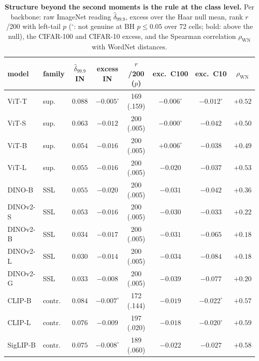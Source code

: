 \begin{table}[t]
\centering
\small
\setlength{\tabcolsep}{3.4pt}
\begin{tabular}{l l c c c c c c}
\toprule
model & family & $\hat\delta_{99.9}$ IN & excess IN & $r$/200 ($p$) & exc.\ C100 & exc.\ C10 & $\rho_{\text{WN}}$ \\
\midrule
ViT-T & sup. & $0.088$ & $-0.005^{\circ}$ & 169 (.159) & $-0.006^{\circ}$ & $-0.012^{\circ}$ & $+0.52$ \\
ViT-S & sup. & $0.063$ & $-0.012$ & 200 (.005) & $-0.000^{\circ}$ & $-0.042$ & $+0.50$ \\
ViT-B & sup. & $0.054$ & $-0.016$ & 200 (.005) & \textbf{$+0.006^{\circ}$} & $-0.038$ & $+0.49$ \\
ViT-L & sup. & $0.055$ & $-0.016$ & 200 (.005) & $-0.020$ & $-0.037$ & $+0.53$ \\
\midrule
DINO-B & SSL & $0.055$ & $-0.020$ & 200 (.005) & $-0.031$ & $-0.042$ & $+0.36$ \\
DINOv2-S & SSL & $0.053$ & $-0.016$ & 200 (.005) & $-0.030$ & $-0.033$ & $+0.22$ \\
DINOv2-B & SSL & $0.034$ & $-0.017$ & 200 (.005) & $-0.031$ & $-0.065$ & $+0.18$ \\
DINOv2-L & SSL & $0.030$ & $-0.014$ & 200 (.005) & $-0.034$ & $-0.084$ & $+0.18$ \\
DINOv2-G & SSL & $0.033$ & $-0.008$ & 200 (.005) & $-0.039$ & $-0.077$ & $+0.20$ \\
\midrule
CLIP-B & contr. & $0.084$ & $-0.007^{\circ}$ & 172 (.144) & $-0.019$ & $-0.022^{\circ}$ & $+0.57$ \\
CLIP-L & contr. & $0.076$ & $-0.009$ & 197 (.020) & $-0.018$ & $-0.020^{\circ}$ & $+0.59$ \\
SigLIP-B & contr. & $0.075$ & $-0.008^{\circ}$ & 189 (.060) & $-0.022$ & $-0.027$ & $+0.58$ \\
\bottomrule
\end{tabular}
\caption{\textbf{Structure beyond the second moments is the rule at the class level.} Per backbone: raw ImageNet reading $\hat\delta_{99.9}$, excess over the Haar null mean, rank $r$/200 with left-tail $p$ ($^{\circ}$: not genuine at BH $p\le0.05$ over 72 cells; bold: above the null), the CIFAR-100 and CIFAR-10 excess, and the Spearman correlation $\rho_{\text{WN}}$ with WordNet distances. %
}
\label{tab:census}
\end{table}
